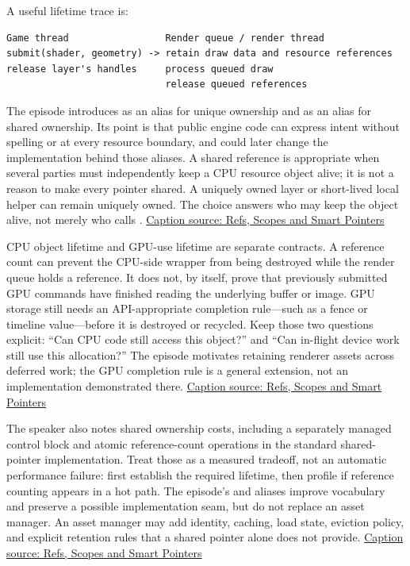 A useful lifetime trace is:

\begin{verbatim}
Game thread                 Render queue / render thread
submit(shader, geometry) -> retain draw data and resource references
release layer's handles     process queued draw
                            release queued references
\end{verbatim}

The  episode introduces  as an alias for unique ownership and  as an alias for shared ownership. Its point is that public engine code can express intent without spelling  or  at every resource boundary, and could later change the implementation behind those aliases. A shared reference is appropriate when several parties must independently keep a CPU resource object alive; it is not a reason to make every pointer shared. A uniquely owned layer or short-lived local helper can remain uniquely owned. The choice answers who may keep the object alive, not merely who calls . \href{https://www.youtube.com/watch?v=HkGZ378nArE}{Caption source: Refs, Scopes and Smart Pointers}

CPU object lifetime and GPU-use lifetime are separate contracts. A reference count can prevent the CPU-side wrapper from being destroyed while the render queue holds a reference. It does not, by itself, prove that previously submitted GPU commands have finished reading the underlying buffer or image. GPU storage still needs an API-appropriate completion rule---such as a fence or timeline value---before it is destroyed or recycled. Keep those two questions explicit: ``Can CPU code still access this object?'' and ``Can in-flight device work still use this allocation?'' The episode motivates retaining renderer assets across deferred work; the GPU completion rule is a general extension, not an implementation demonstrated there. \href{https://www.youtube.com/watch?v=HkGZ378nArE}{Caption source: Refs, Scopes and Smart Pointers}

The speaker also notes shared ownership costs, including a separately managed control block and atomic reference-count operations in the standard shared-pointer implementation. Treat those as a measured tradeoff, not an automatic performance failure: first establish the required lifetime, then profile if reference counting appears in a hot path. The episode's  and  aliases improve vocabulary and preserve a possible implementation seam, but do not replace an asset manager. An asset manager may add identity, caching, load state, eviction policy, and explicit retention rules that a shared pointer alone does not provide. \href{https://www.youtube.com/watch?v=HkGZ378nArE}{Caption source: Refs, Scopes and Smart Pointers}

